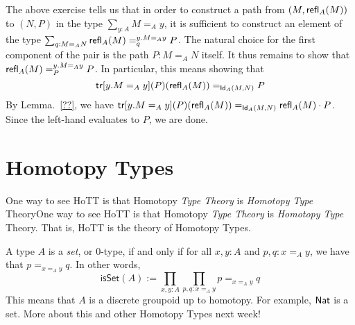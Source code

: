 \documentclass[12pt]{article}
\newcommand{\tr}{\mathsf{tr}}
\begin{document}
The above exercise tells us that in order to construct a path from $(M,\mathsf{refl}_{A}(M))$ to $(N,P)$ in the type $\sum_{y:A}M=_A y$, it is sufficient to construct an element of the type 
$\sum_{q:M=_A N}\mathsf{refl}_{A}(M) =^{y.M=_A y}_q P$. The natural choice for the first component of the pair is the path $P : M=_A N$ itself. It thus remains to show that $\mathsf{refl}_{A}(M) =^{y.M=_A y}_P P$. In particular, this means showing that \[ \tr[y.M=_A y](P)(\refl{A}(M)) =_{\Id{A}(M,N)} P \]
By Lemma.~\ref{??}, we have $\tr[y.M=_A y](P)(\refl{A}(M)) =_{\Id{A}(M,N)} \refl{A}(M) \cdot P$. Since the left-hand evaluates to $P$, we are done.

\section{Homotopy Types}\label{}

One way to see HoTT is that Homotopy \emph{Type Theory} is
\emph{Homotopy Type} TheoryOne way to see HoTT is that Homotopy \emph{Type Theory} is
\emph{Homotopy Type} Theory. That is, HoTT is the theory of Homotopy Types.

A type $A$ is a \emph{set}, or $0$-type, if and only if for all $x,y:A$ and $p,q:x=_Ay$,
we have that $p=_{x=_Ay}q$. In other words,
\[
\textsf{isSet}(A) := \prod_{x,y:A}\prod_{p,q:x=_Ay}p=_{x=_Ay}q
\]
This means that $A$ is a discrete groupoid up to homotopy. For example, $\mathsf{Nat}$ is a set.
More about this and other Homotopy Types next week!
\end{document}
